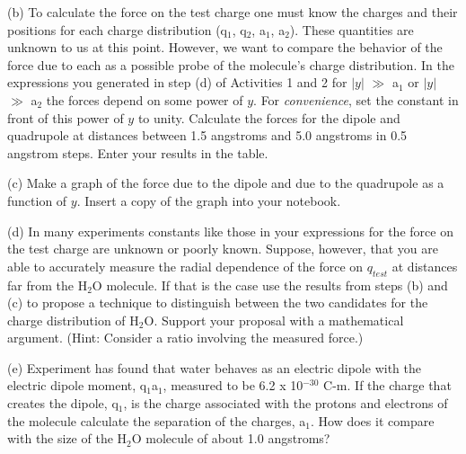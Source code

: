 (b) To calculate the force on the test charge one must know the charges
and their positions for each charge distribution (q\( _{1} \), q\( _{2} \),
a\( _{1} \), a\( _{2} \)). These quantities are unknown to us at
this point. However, we want to compare the behavior of the force
due to each as a possible probe of the molecule's charge distribution.
In the expressions you generated in step (d) of Activities 1 and 2
for \( \left| y\right|  \) \( \gg  \) a\( _{1} \) or \( \left| y\right|  \)
\( \gg  \) a\( _{2} \) the forces depend on some power of \( y \). For
\emph{convenience}, set the constant in front of this power of \( y \) to
unity. Calculate the forces for the dipole and quadrupole at distances
between 1.5 angstroms and 5.0 angstroms in 0.5 angstrom steps. Enter
your results in the table.

(c) Make a graph of the force due to the dipole and due to the quadrupole
as a function of \( y \). Insert a copy of the graph into your notebook.

(d) In many experiments constants like those in your expressions for
the force on the test charge are unknown or poorly known. Suppose,
however, that you are able to accurately measure the radial dependence
of the force on $q_{test}$ at distances far from the H\( _{2} \)O
molecule. If that is the case use the results from steps (b) and (c)
to propose a technique to distinguish between the two candidates for
the charge distribution of H\( _{2} \)O. Support your proposal with
a mathematical argument. (Hint: Consider a ratio involving the measured
force.)
\answerspace{25mm}

(e) Experiment has found that water behaves as an electric dipole
with the electric dipole moment, q\( _{1} \)a\( _{1} \), measured
to be 6.2 x 10\( ^{-30} \) C-m. If the charge that creates the dipole,
q\( _{1} \), is the charge associated with the protons and electrons
of the molecule calculate the separation of the charges, a\( _{1} \).
How does it compare with the size of the H\( _{2} \)O molecule of
about 1.0 angstroms?
\answerspace{15mm}

